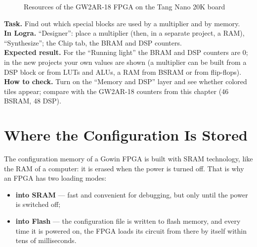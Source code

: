 \begin{figure}[H]
\centering
{}
\caption{Resources of the GW2AR-18 FPGA on the Tang Nano 20K board}
\end{figure}

\begin{diybox}
\textbf{Task.} Find out which special blocks are used by a multiplier and by memory.\\
\textbf{In Logra.} ``Designer'': place a multiplier (then, in a separate project, a RAM), ``Synthesize''; the Chip tab, the BRAM and DSP counters.\\
\textbf{Expected result.} For the ``Running light'' the BRAM and DSP counters are 0; in the new projects your own values are shown (a multiplier can be built from a DSP block or from LUTs and ALUs, a RAM from BSRAM or from flip-flops).\\
\textbf{How to check.} Turn on the ``Memory and DSP'' layer and see whether colored tiles appear; compare with the GW2AR-18 counters from this chapter (46 BSRAM, 48 DSP).
\end{diybox}

\section{Where the Configuration Is Stored}

The configuration memory of a Gowin FPGA is built with SRAM technology, like the
RAM of a computer: it is erased when the power is turned off. That is why
an FPGA has two loading modes:
\begin{itemize}
  \item \textbf{into SRAM} --- fast and convenient for debugging, but only until the power is switched off;
  \item \textbf{into Flash} --- the configuration file is written to flash memory,
        and every time it is powered on, the FPGA loads its circuit from there by itself
        within tens of milliseconds.
\end{itemize}

